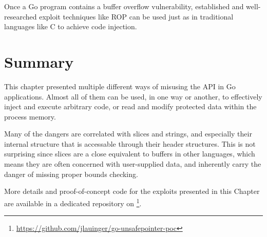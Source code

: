 \begin{insight}
    Once a Go program contains a buffer overflow vulnerability, established and well-researched exploit techniques like
    \acrshort{ROP} can be used just as in traditional languages like C to achieve code injection.
\end{insight}



\section{Summary}\label{sec:unsafe-security-problems:summary}

This chapter presented multiple different ways of misusing the \unsafe{} \acrshort{API} in Go applications.
Almost all of them can be used, in one way or another, to effectively inject and execute arbitrary code, or read and
modify protected data within the process memory.

Many of the dangers are correlated with slices and strings, and especially their internal structure that is accessable
through their header structures.
This is not surprising since slices are a close equivalent to buffers in other languages, which means they are often
concerned with user-supplied data, and inherently carry the danger of missing proper bounds checking.

More details and proof-of-concept code for the exploits presented in this Chapter are available in a dedicated
repository on \github{}\footnote{\url{https://github.com/jlauinger/go-unsafepointer-poc}}.
